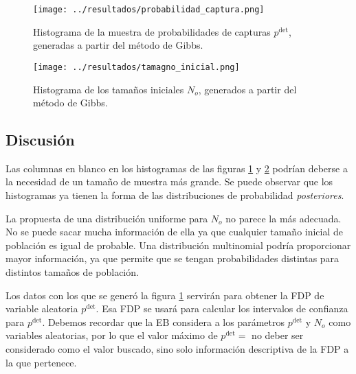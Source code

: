 \documentclass{article}
\begin{document}
\begin{figure}[h]
\centering
\texttt{[image: ../resultados/probabilidad\_captura.png]}
\caption{Histograma de la muestra de probabilidades de capturas
$p^{\mbox{det}}$, generadas a partir del m\'etodo de Gibbs.}
\label{fproCap}
\end{figure}
\begin{figure}[h]
\centering
\texttt{[image: ../resultados/tamagno\_inicial.png]}
\caption{Histograma de los tama\~nos iniciales
$N_o$, generados a partir del m\'etodo de Gibbs.}
\label{ftamIni}
\end{figure}

\subsection*{Discusi\'on}
Las columnas en blanco en los histogramas de las figuras \ref{fproCap} y
\ref{ftamIni} podr\'ian deberse a la necesidad de un tama\~no de muestra m\'as
grande. Se puede observar que los histogramas ya tienen la forma de las
distribuciones de probabilidad {\it posteriores}.

La propuesta de una distribuci\'on uniforme para $N_o$ no parece la m\'as
adecuada. No se puede sacar mucha informaci\'on de ella ya que cualquier
tama\~no inicial de poblaci\'on es igual de probable. Una distribuci\'on
multinomial podr\'ia proporcionar mayor informaci\'on, ya que permite que se
tengan probabilidades distintas para distintos tama\~nos de poblaci\'on.

Los datos con los que se gener\'o la figura \ref{fproCap} servir\'an para
obtener la FDP de variable aleatoria
$p^{\mbox{det}}$. Esa FDP se usar\'a para calcular
los intervalos de confianza para $p^{\mbox{det}}$. Debemos recordar que la EB
considera a los par\'ametros $p^{\mbox{det}}$ y $N_o$ como variables aleatorias,
por lo que el valor m\'aximo de
$p^{\mbox{det}}=$ no deber ser
considerado como el valor buscado, sino solo informaci\'on descriptiva de la FDP
a la que pertenece.
\end{document}
